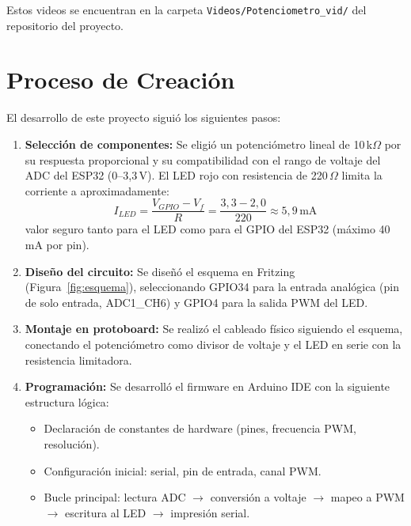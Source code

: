 \documentclass[12pt,a4paper]{article}
\begin{document}
Estos videos se encuentran en la carpeta \texttt{Videos/Potenciometro\_vid/} del repositorio del proyecto.

\section{Proceso de Creación}

El desarrollo de este proyecto siguió los siguientes pasos:

\begin{enumerate}
    \item \textbf{Selección de componentes:} Se eligió un potenciómetro lineal de 10\,k$\Omega$ por su respuesta proporcional y su compatibilidad con el rango de voltaje del ADC del ESP32 (0--3,3\,V). El LED rojo con resistencia de 220\,$\Omega$ limita la corriente a aproximadamente:
    \begin{equation*}
        I_{LED} = \frac{V_{GPIO} - V_f}{R} = \frac{3{,}3 - 2{,}0}{220} \approx 5{,}9\,\text{mA}
    \end{equation*}
    valor seguro tanto para el LED como para el GPIO del ESP32 (máximo 40\,mA por pin).
    
    \item \textbf{Diseño del circuito:} Se diseñó el esquema en Fritzing (Figura~\ref{fig:esquema}), seleccionando GPIO34 para la entrada analógica (pin de solo entrada, ADC1\_CH6) y GPIO4 para la salida PWM del LED.
    
    \item \textbf{Montaje en protoboard:} Se realizó el cableado físico siguiendo el esquema, conectando el potenciómetro como divisor de voltaje y el LED en serie con la resistencia limitadora.
    
    \item \textbf{Programación:} Se desarrolló el firmware en Arduino IDE con la siguiente estructura lógica:
    \begin{itemize}
        \item Declaración de constantes de hardware (pines, frecuencia PWM, resolución).
        \item Configuración inicial: serial, pin de entrada, canal PWM.
        \item Bucle principal: lectura ADC $\rightarrow$ conversión a voltaje $\rightarrow$ mapeo a PWM $\rightarrow$ escritura al LED $\rightarrow$ impresión serial.
    \end{itemize}
    

\end{enumerate}
\end{document}
